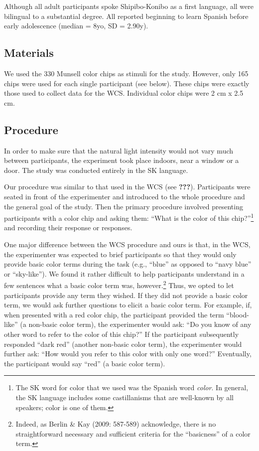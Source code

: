\documentclass[floatsintext,man]{apa6}
\theoremstyle{definition}
\theoremstyle{definition}
\theoremstyle{definition}
\theoremstyle{remark}
\begin{document}
Although all adult participants spoke Shipibo-Konibo as a first
language, all were bilingual to a substantial degree. All reported
beginning to learn Spanish before early adolescence (median = 8yo, SD =
2.90y).

\subsection{Materials}\label{materials}

We used the 330 Munsell color chips as stimuli for the study. However,
only 165 chips were used for each single participant (see below). These
chips were exactly those used to collect data for the WCS. Individual
color chips were 2 cm x 2.5 cm.

\subsection{Procedure}\label{procedure}

In order to make sure that the natural light intensity would not vary
much between participants, the experiment took place indoors, near a
window or a door. The study was conducted entirely in the SK language.

Our procedure was similar to that used in the WCS (see {\textbf{???}}).
Participants were seated in front of the experimenter and introduced to
the whole procedure and the general goal of the study. Then the primary
procedure involved presenting participants with a color chip and asking
them: \enquote{What is the color of this chip?}\footnote{The SK word for
  color that we used was the Spanish word \emph{color}. In general, the
  SK language includes some castillanisms that are well-known by all
  speakers; color is one of them.} and recording their response or
responses.

One major difference between the WCS procedure and ours is that, in the
WCS, the experimenter was expected to brief participants so that they
would only provide basic color terms during the task (e.g.,
\enquote{blue} as opposed to \enquote{navy blue} or \enquote{sky-like}).
We found it rather difficult to help participants understand in a few
sentences what a basic color term was, however.\footnote{Indeed, as
  Berlin \& Kay (2009: 587-589) acknowledge, there is no straightforward
  necessary and sufficient criteria for the \enquote{basicness} of a
  color term.} Thus, we opted to let participants provide any term they
wished. If they did not provide a basic color term, we would ask further
questions to elicit a basic color term. For example, if, when presented
with a red color chip, the participant provided the term
\enquote{blood-like} (a non-basic color term), the experimenter would
ask: \enquote{Do you know of any other word to refer to the color of
this chip?} If the participant subsequently responded \enquote{dark red}
(another non-basic color term), the experimenter would further ask:
\enquote{How would you refer to this color with only one word?}
Eventually, the participant would say \enquote{red} (a basic color
term).
\end{document}
